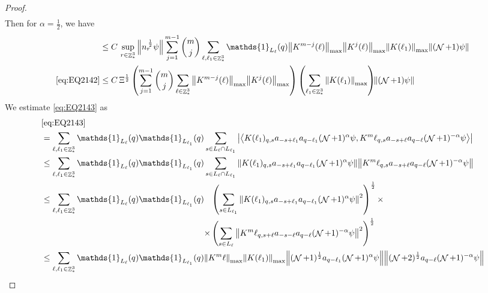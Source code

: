 \documentclass[sn-mathphys, Numbered ,a4paper]{sn-jnl}%
\DeclareMathOperator{\Z}{\mathbb{Z}}
\DeclareMathOperator{\NN}{\mathcal{N}}
\newcommand{\half}{\frac{1}{2}}
\newcommand{\eva}[1]{\left\langle #1 \right\rangle}
\theoremstyle{plain}
\theoremstyle{definition}
\theoremstyle{remark}
\theoremstyle{plain}
\theoremstyle{definition}
\theoremstyle{remark}
\begin{document}
\begin{proof}
\begin{align}
	\end{align} 
	Then for $\alpha = \half$, we have
	\begin{align}
		&\leq C\, \sup\limits_{r \in \Z^3_*} \norm{ n_{r}^{\,\half} \psi } \sum\limits_{j=1}^{m-1} {{m}\choose j} \sum\limits_{\ell, \ell_1\in \Z^3_*} \mathds{1}_{L_{\ell}}(q) \norm{K^{m-j}(\ell)}_{\mathrm{max}} \norm{K^{j}(\ell)}_{\mathrm{max}} \norm{ K(\ell_1)}_{\mathrm{max}} \norm{(\NN+1) \psi} \nonumber\\
		\eqref{eq:EQ2142} &\leq  C \, \Xi^\half \left(  \sum\limits_{j=1}^{m-1} {{m}\choose j} \sum\limits_{\ell \in \Z^3_*} \norm{K^{m-j}(\ell)}_{\mathrm{max}} \norm{ K^{j}(\ell)}_{\mathrm{max}}\right) \left( \sum\limits_{ \ell_1\in \Z^3_*}\norm{ K(\ell_1) }_{\mathrm{max}} \right)\!\! \norm{(\NN+1) \psi }\label{eq:estEQ2142}
	\end{align}
	We estimate \eqref{eq:EQ2143} as 
	\begin{align}
		&\eqref{eq:EQ2143}\nonumber\\
		&=\sum\limits_{\ell, \ell_1\in \Z^3_*} \mathds{1}_{L_{\ell}}(q) \mathds{1}_{L_{\ell_1}}(q) \sum\limits_{ s \in L_{\ell}\cap L_{\ell_1}} \abs{\eva{K(\ell_1)_{q,s} a_{-s+\ell_1} a_{q-\ell_1}  (\NN+1)^{\alpha}\psi, K^m{\ell}_{q,s}  a_{-s+\ell} a_{q-\ell} (\NN+1)^{-\alpha} \psi }} \nonumber\\
		&\leq \sum\limits_{\ell, \ell_1\in \Z^3_*} \mathds{1}_{L_{\ell}}(q) \mathds{1}_{L_{\ell_1}}(q) \sum\limits_{ s \in L_{\ell} \cap L_{\ell_1}} \norm{K(\ell_1)_{q,s} a_{-s+\ell_1} a_{q-\ell_1}  (\NN+1)^{\alpha}\psi}\norm{ K^m{\ell}_{q,s}  a_{-s+\ell} a_{q-\ell} (\NN+1)^{-\alpha} \psi } \nonumber\\
		&\leq \sum\limits_{\ell, \ell_1\in \Z^3_*} \mathds{1}_{L_{\ell}}(q) \mathds{1}_{L_{\ell_1}}(q) \begin{aligned}[t]&\left(\sum\limits_{ s \in L_{\ell_1}} \norm{K(\ell_1)_{q,s} a_{-s+\ell_1} a_{q-\ell_1}  (\NN+1)^{\alpha}\psi}^2\right)^\half \times \nonumber\\ \times &\left( \sum\limits_{ s \in L_{\ell} } \norm{ K^m{\ell}_{q,s+\ell}  a_{-s-\ell} a_{q-\ell} (\NN+1)^{-\alpha} \psi }^2\right)^\half \end{aligned}\nonumber\\
		&\leq \sum\limits_{\ell, \ell_1\in \Z^3_*} \mathds{1}_{L_{\ell}}(q) \mathds{1}_{L_{\ell_1}}(q) \norm{K^m{\ell}}_{\mathrm{max}} \norm{K(\ell_1)}_{\mathrm{max}} \norm{ (\NN+1)^\half a_{q-\ell_1}  (\NN+1)^{\alpha}\psi} \norm{  (\NN+2)^\half  a_{q-\ell} (\NN+1)^{-\alpha} \psi } \nonumber
	\end{align} 

\end{proof}
\end{document}
